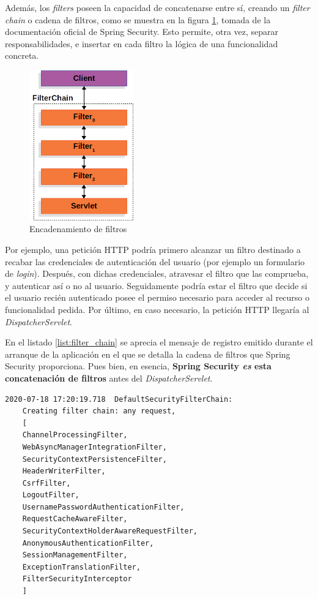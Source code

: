 \documentclass[a4paper]{article}
\begin{document}
	Además, los \emph{filters} poseen la capacidad de concatenarse entre sí, creando un \emph{filter chain} o cadena de filtros, como se muestra en la figura \ref{fig:filterchain}, tomada de la documentación oficial de Spring Security. Esto permite, otra vez, separar responsabilidades, e insertar en cada filtro la lógica de una funcionalidad concreta.
	
	\begin{figure}[hbt!]
		\centering
		\includegraphics[width=0.4\textwidth,keepaspectratio]{filterchain}
		\caption{Encadenamiento de filtros}
		\label{fig:filterchain}
	\end{figure}
	
	Por ejemplo, una petición HTTP podría primero alcanzar un filtro destinado a recabar las credenciales de autenticación del usuario (por ejemplo un formulario de \emph{login}). Después, con dichas credenciales, atravesar el filtro que las comprueba, y autenticar así o no al usuario. Seguidamente podría estar el filtro que decide si el usuario recién autenticado posee el permiso necesario para acceder al recurso o funcionalidad pedida. Por último, en caso necesario, la petición HTTP llegaría al \emph{DispatcherServlet}.
	
	En el listado \ref{list:filter_chain} se aprecia el mensaje de registro emitido durante el arranque de la aplicación en el que se detalla la cadena de filtros que Spring Security proporciona. Pues bien, en esencia, \textbf{Spring Security \emph{es} esta concatenación de filtros} antes del \emph{DispatcherServlet}. 
	\\
	
	\begin{lstlisting}[caption=Cadena de filtros creada por Spring Security, label=list:filter_chain]
	2020-07-18 17:20:19.718  DefaultSecurityFilterChain: 
	Creating filter chain: any request, 
	[
	ChannelProcessingFilter, 
	WebAsyncManagerIntegrationFilter, 
	SecurityContextPersistenceFilter, 
	HeaderWriterFilter, 
	CsrfFilter, 
	LogoutFilter, 
	UsernamePasswordAuthenticationFilter, 
	RequestCacheAwareFilter, 
	SecurityContextHolderAwareRequestFilter, 
	AnonymousAuthenticationFilter, 
	SessionManagementFilter, 
	ExceptionTranslationFilter, 
	FilterSecurityInterceptor
	]
	\end{lstlisting}
	
\end{document}
